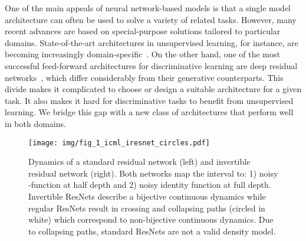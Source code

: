 \documentclass{article}
\begin{document}
One of the main appeals of neural network-based models is that a single model architecture can often be used to solve a variety of related tasks. However, many recent advances are based on special-purpose solutions tailored to particular domains. State-of-the-art architectures in unsupervised learning, for instance, are becoming increasingly domain-specific~\cite{oord2016pixel,kingma2018glow,DBLP:conf/icml/ParmarVUKSKT18,karras2018style,van2016wavenet}.
On the other hand, one of the most successful feed-forward architectures for discriminative learning are deep residual networks~\cite{he2016deep,zagoruyko2016wide}, which differ considerably from their generative counterparts.
This divide makes it complicated to choose or design a suitable architecture for a given task. It also makes it hard for discriminative tasks to benefit from unsupervised learning.
We bridge this gap with a new class of architectures that perform well in both domains.





\begin{figure}
    \centering
    {{\texttt{[image: img/fig\_1\_icml\_iresnet\_circles.pdf]} }}
    \label{fig:imgen_cropped}
    \vspace{-5mm}
     \caption{Dynamics of a standard residual network (left) and invertible residual network (right). Both networks map the interval  to: 1) noisy -function at half depth and 2) noisy identity function at full depth. Invertible ResNets describe a bijective continuous dynamics while regular ResNets result in crossing and collapsing paths (circled in white) which correspond to non-bijective continuous dynamics. Due to collapsing paths, standard ResNets are not a valid density model.}
     \label{fig:crossingPaths}
\end{figure}
\end{document}

